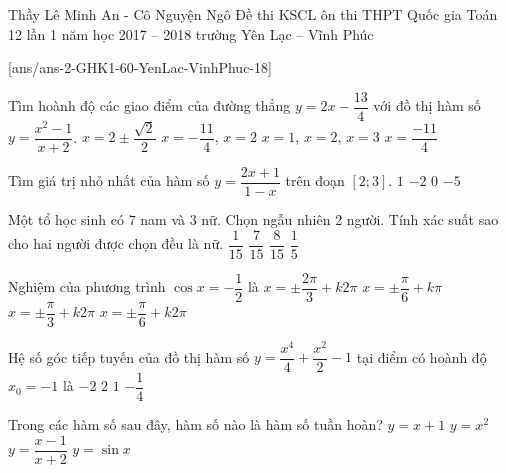 
\begin{name}
{Thầy Lê Minh An - Cô Nguyện Ngô}
{Đề thi KSCL ôn thi THPT Quốc gia Toán 12 lần 1 năm học 2017 – 2018 trường Yên Lạc – Vĩnh Phúc}
\end{name}
\setcounter{ex}{0}
[ans/ans-2-GHK1-60-YenLac-VinhPhuc-18]
\begin{ex}%
Tìm hoành độ các giao điểm của đường thẳng $y=2x-\dfrac{13}{4}$ với đồ thị hàm số $y=\dfrac{x^2-1}{x+2}$.
\choice
{$x=2\pm\dfrac{\sqrt{2}}{2}$}
{\True $x=-\dfrac{11}{4}$, $x=2$}
{$x=1$, $x=2$, $x=3$}
{$x=\dfrac{-11}{4}$}
\end{ex}

\begin{ex}%
Tìm giá trị nhỏ nhất của hàm số $y=\dfrac{2x+1}{1-x}$ trên đoạn $[2;3]$.
\choice
{$1$}
{$-2$}
{$0$}
{\True $-5$}
\end{ex}

\begin{ex}%
Một tổ học sinh có $7$ nam và $3$ nữ. Chọn ngẫu nhiên 2 người. Tính xác suất sao cho hai người được chọn đều là nữ.
\choice
{\True $\dfrac{1}{15}$}
{$\dfrac{7}{15}$}
{$\dfrac{8}{15}$}
{$\dfrac{1}{5}$}
\end{ex}

\begin{ex}%
Nghiệm của phương trình $\cos x=-\dfrac{1}{2}$ là
\choice
{\True $x=\pm\dfrac{2\pi}{3}+k2\pi$}
{$x=\pm\dfrac{\pi}{6}+k\pi$}
{$x=\pm\dfrac{\pi}{3}+k2\pi$}
{$x=\pm\dfrac{\pi}{6}+k2\pi$}
\end{ex}

\begin{ex}%
Hệ số góc tiếp tuyến của đồ thị hàm số $y=\dfrac{x^4}{4}+\dfrac{x^2}{2}-1$ tại điểm có hoành độ $x_0=-1$ là
\choice
{\True $-2$}
{$2$}
{$1$}
{$-\dfrac{1}{4}$}
\end{ex}
\begin{ex}%
Trong các hàm số sau đây, hàm số nào là hàm số tuần hoàn?
\choice
{$y=x+1$}
{$y=x^2$}
{$y=\dfrac{x-1}{x+2}$}
{\True $y=\sin x$}
\end{ex}

